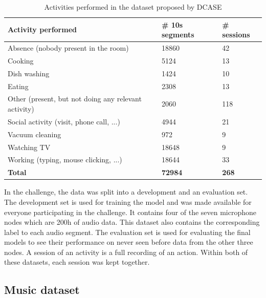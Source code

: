 \begin{table}[htbp]
    \centering
    \caption[Activities performed in the dataset proposed by DCASE]{Activities performed in the dataset proposed by DCASE \footnotemark}
	\label{tab:DCASE-activiies-performed}
    \begin{tabular}{l|l|l}
        \toprule
        \textbf{Activity performed} & \textbf{\# 10s segments} & \textbf{\# sessions} \\ 
        \midrule[1pt]
        Absence (nobody present in the room) & 18860 & 42 \\
        \hline
        Cooking & 5124 & 13 \\ 
        \hline
        Dish washing & 1424 & 10 \\ 
        \hline
        Eating & 2308 & 13 \\ 
        \hline
        Other (present, but not doing any relevant activity) & 2060 & 118 \\ 
        \hline
        Social activity (visit, phone call, ...) & 4944 & 21 \\ 
        \hline
        Vacuum cleaning & 972 & 9 \\ 
        \hline
        Watching TV & 18648 & 9 \\ 
        \hline
        Working (typing, mouse clicking, ...) & 18644 & 33 \\ 
        \midrule[1pt]
        \textbf{Total} & \textbf{72984} & \textbf{268} \\
        \bottomrule
    \end{tabular}
\end{table}
\noindent
In the challenge, the data was split into a development and an evaluation set. The development set is used for training the model and was made available for everyone participating in the challenge. It contains four of the seven microphone nodes which are 200h of audio data. This dataset also contains the corresponding label to each audio segment. The evaluation set is used for evaluating the final models to see their performance on never seen before data from the other three nodes. A session of an activity is a full recording of an action. Within both of these datasets, each session was kept together.

\subsection{Music dataset}
\label{sub:Music-Dataset}

